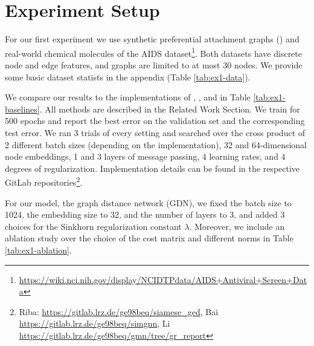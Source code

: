 \section{Experiment Setup}

For our first experiment we use synthetic preferential attachment graphs (\citealp{pref_att2002}) and real-world chemical molecules of the AIDS dataset\footnote{\url{https://wiki.nci.nih.gov/display/NCIDTPdata/AIDS+Antiviral+Screen+Data}}. Both datasets have discrete node and edge features, and graphs are limited to at most 30 nodes. We provide some basic dataset statists in the appendix (Table \ref{tab:ex1-data}).

We compare our results to the implementations of \cite{riba2018}, \cite{bai2019}, and \cite{li2019} in Table \ref{tab:ex1-baselines}. All methods are described in the Related Work Section. We train for 500 epochs and report the best error on the validation set and the corresponding test error. We ran 3 trials of every setting and searched over the cross product of 2 different batch sizes (depending on the implementation), 32 and 64-dimensional node embeddings, 1 and 3 layers of message passing, 4 learning rates, and 4 degrees of regularization. Implementation details can be found in the respective GitLab repositories\footnote{Riba: \url{https://gitlab.lrz.de/ge98beq/siamese_ged}, Bai \url{https://gitlab.lrz.de/ge98beq/simgnn}, Li \url{https://gitlab.lrz.de/ge98beq/gmn/tree/gr_report}}.

For our model, the graph distance network (GDN), we fixed the batch size to 1024, the embedding size to 32, and the number of layers to 3, and added 3 choices for the Sinkhorn regularization constant $\lambda$. Moreover, we include an ablation study over the choice of the cost matrix and different norms in Table \ref{tab:ex1-ablation}.
